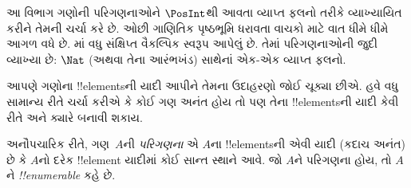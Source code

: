 \documentclass[../../../include/open-logic-section]{subfiles}
\begin{document}


\begin{editorial}
આ વિભાગ ગણોની પરિગણનાઓને $\PosInt$થી આવતા વ્યાપ્ત
ફલનો તરીકે વ્યાખ્યાયિત કરીને તેમની ચર્ચા કરે છે.
ઓછી ગાણિતિક પૃષ્ઠભૂમિ ધરાવતા વાચકો માટે વાત ધીમે ધીમે
આગળ વધે છે. માં વધુ સંક્ષિપ્ત
વૈકલ્પિક સ્વરૂપ આપેલું છે. તેમાં પરિગણનાઓની જુદી વ્યાખ્યા
છે: $\Nat$ (અથવા તેના આરંભખંડ) સાથેનાં એક-એક
વ્યાપ્ત ફલનો.
\end{editorial}

\begin{explain}
આપણે ગણોના !!{element}sની યાદી આપીને તેમના ઉદાહરણો
જોઈ ચૂક્યા છીએ. હવે વધુ સામાન્ય રીતે ચર્ચા કરીએ કે
કોઈ ગણ અનંત હોય તો પણ તેના !!{element}sની યાદી
કેવી રીતે અને ક્યારે બનાવી શકાય.
\end{explain}

\begin{defn}[પરિગણના, અનૌપચારિક રીતે]
અનૌપચારિક રીતે, ગણ~$A$ની \emph{પરિગણના} એ
$A$ના !!{element}sની એવી યાદી (કદાચ અનંત) છે
કે $A$નો દરેક !!{element} યાદીમાં કોઈ સાન્ત સ્થાને
આવે. જો $A$ને પરિગણના હોય, તો $A$ને
\emph{!!{enumerable}} કહે છે.
\end{defn}
\end{document}

